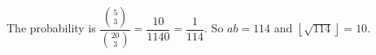 The probability is $\dfrac{\binom53}{\binom{20}3}=\dfrac{10}{1140}=\dfrac1{114}$. So $ab=114$ and $\left\lfloor\sqrt{114}\right\rfloor=\boxed{10}$.
